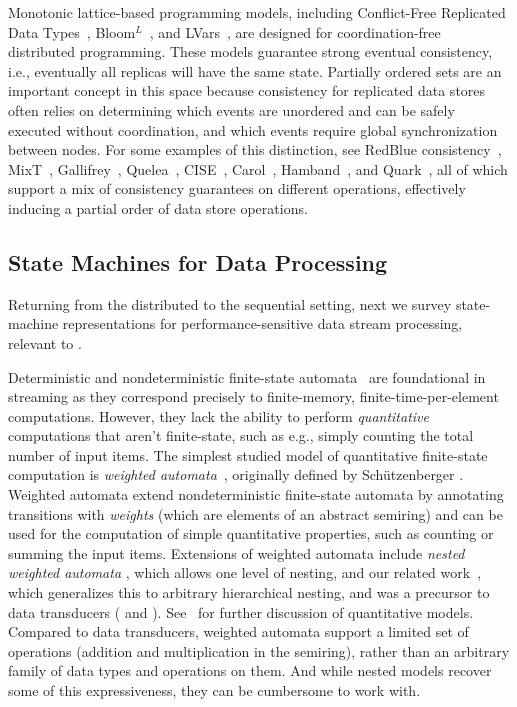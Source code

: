 Monotonic lattice-based programming models,
including Conflict-Free Replicated Data Types~\cite{shapiro2011conflict},
Bloom$^L$~\cite{conway12},
and LVars~\cite{lvars13,lvars14},
are designed for coordination-free distributed programming.
These models guarantee strong eventual consistency,
i.e., eventually all replicas will have the same state.
Partially ordered sets are an important concept in this space
because consistency for replicated data stores
often relies on determining which events are unordered and can be
safely executed without coordination,
and which events require global synchronization between nodes.
For some examples of this distinction,
see RedBlue consistency~\cite{li2012making},
MixT~\cite{milano2018mixt},
Gallifrey~\cite{milano2019tour},
Quelea~\cite{sivaramakrishnan2015declarative},
CISE~\cite{gotsman16},
Carol~\cite{lewchenko2019sequential},
Hamband~\cite{houshmand2022hamband},
and Quark~\cite{kaki2022runtime},
all of which support a mix of consistency guarantees on different operations,
effectively inducing a partial order of data store operations.

\subsection{State Machines for Data Processing}

Returning from the distributed to the sequential setting,
next we survey state-machine representations for performance-sensitive
data stream processing, relevant to .

Deterministic and nondeterministic finite-state automata~\cite{rabin1959finite} are foundational in streaming as they correspond precisely to finite-memory, finite-time-per-element computations. However, they lack the ability to perform \emph{quantitative} computations that aren't finite-state, such as e.g., simply counting the total number of input items.
The simplest studied model of quantitative finite-state computation is
\emph{weighted automata}~\cite{ABK2011WA,DKV2009HWA}, originally defined by Schützenberger \cite{S1961WA}.
Weighted automata extend nondeterministic finite-state automata by annotating transitions with \emph{weights} (which are elements of an abstract semiring) and can be used for the computation of simple quantitative properties, such as counting or summing the input items.
Extensions of weighted automata include \emph{nested weighted automata} \cite{CHO2015NWA}, which allows one level of nesting, and our related work~, which generalizes this to arbitrary hierarchical nesting, and was a precursor to data transducers ( and ).
See~\cite{CDH2010QL,CHO2016QMA} for further discussion of quantitative models.
Compared to data transducers, weighted automata support a limited set of operations (addition and multiplication in the semiring), rather than an arbitrary family of data types and operations on them.
And while nested models recover some of this expressiveness, they can be cumbersome to work with.


